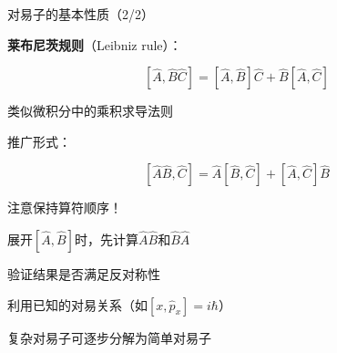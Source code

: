 \begin{frame}{对易子的基本性质（2/2）}
    \begin{iqbitemize}
    \item \textbf{莱布尼茨规则}（Leibniz rule）：
    \end{iqbitemize}
      \[
        [\hat{A}, \hat{B}\hat{C}] = [\hat{A}, \hat{B}]\hat{C} + \hat{B}[\hat{A}, \hat{C}]
      \]
    \begin{iqbitemize}
    \item 类似微积分中的乘积求导法则
    \item 推广形式：
    \end{iqbitemize}
      \[
        [\hat{A}\hat{B}, \hat{C}] = \hat{A}[\hat{B}, \hat{C}] + [\hat{A}, \hat{C}]\hat{B}
      \]
    \begin{iqbitemize}
    \item 注意保持算符顺序！
    \end{iqbitemize}
    \iqbsmallsep

    \begin{iqbitemize}
    \item 展开$[\hat{A}, \hat{B}]$时，先计算$\hat{A}\hat{B}$和$\hat{B}\hat{A}$
    \item 验证结果是否满足反对称性
    \item 利用已知的对易关系（如$[x, \hat{p}_x] = i\hbar$）
    \item 复杂对易子可逐步分解为简单对易子
    \end{iqbitemize}
    \iqbtinysep

  

\end{frame}

